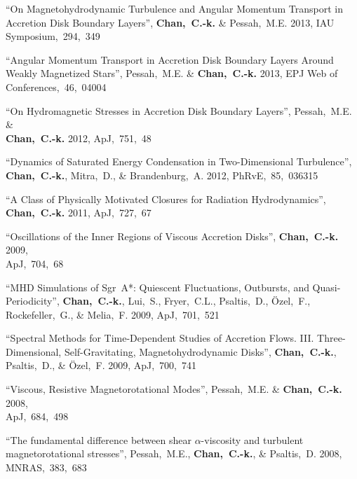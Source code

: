 \begin{ilist}
\item ``On Magnetohydrodynamic Turbulence and Angular Momentum Transport in Accretion Disk Boundary Layers'',
  \textbf{Chan,~C.-k.} \& Pessah,~M.E.
  2013, IAU Symposium,~294,~349

\item ``Angular Momentum Transport in Accretion Disk Boundary Layers Around Weakly Magnetized Stars'',
  Pessah,~M.E. \& \textbf{Chan,~C.-k.}
  2013,  EPJ Web of Conferences,~46,~04004

\item ``On Hydromagnetic Stresses in Accretion Disk Boundary Layers'',
  Pessah,~M.E. \&\\ \textbf{Chan,~C.-k.}
  2012, ApJ,~751,~48

\item ``Dynamics of Saturated Energy Condensation in Two-Dimensional Turbulence'',\\
  \textbf{Chan,~C.-k.}, Mitra,~D., \& Brandenburg,~A.
  2012, PhRvE,~85,~036315

\item ``A Class of Physically Motivated Closures for Radiation Hydrodynamics'',
  \textbf{Chan,~C.-k.}
  2011, ApJ,~727,~67

\item \sm``Oscillations of the Inner Regions of Viscous Accretion Disks'',
  \textbf{Chan,~C.-k.}
  2009,\\ ApJ,~704,~68

\item \sm``MHD Simulations of Sgr~A*: Quiescent Fluctuations, Outbursts, and Quasi-Periodicity'',
  \textbf{Chan,~C.-k.}, Lui,~S., Fryer,~C.L., Psaltis,~D., \"Ozel,~F., Rockefeller,~G., \& Melia,~F.
  2009, ApJ,~701,~521

\item \sm``Spectral Methods for Time-Dependent Studies of Accretion Flows.  III. Three-Dimensional, Self-Gravitating, Magnetohydrodynamic Disks'',
  \textbf{Chan,~C.-k.}, Psaltis,~D., \& \"Ozel,~F.
  2009, ApJ,~700,~741

\item \sm``Viscous, Resistive Magnetorotational Modes'',
  Pessah,~M.E. \& \textbf{Chan,~C.-k.}
  2008,\\ ApJ,~684,~498

\item \sm``The fundamental difference between shear $\alpha$-viscosity and turbulent magnetorotational stresses'',
  Pessah,~M.E., \textbf{Chan,~C.-k.}, \& Psaltis,~D.
  2008, MNRAS,~383,~683


\end{ilist}
